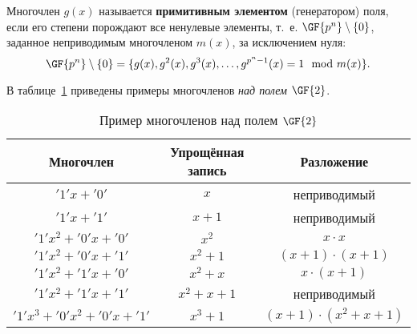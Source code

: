 Многочлен $g(x)$ называется \textbf{примитивным элементом} (генератором) поля, если его степени порождают все ненулевые элементы, т.~е. $\GF{p^n} \setminus \{0\}$, заданное неприводимым многочленом $m(x)$, за исключением нуля:
    \[ \GF{p^n} \setminus \{0\} = \{ g(x), g^2(x), g^3(x), \dots, g^{p^n-1}(x) = 1 \mod m(x) \}. \]

\example
В таблице~\ref{tab:irreducible-gf2} приведены примеры многочленов \emph{над полем} $\GF{2}$.
\begin{table}[!ht]
    \centering
    \caption{Пример многочленов над полем $\GF{2}$\label{tab:irreducible-gf2}}
    \begin{tabular}{|c|c|c|}
        \hline
        Многочлен & \parbox{2.5cm}{Упрощённая запись} & Разложение \\
        \hline
        $'1' x + '0'$ & $x$ & неприводимый \\
        $'1' x + '1'$ & $x+1$ & неприводимый \\
        $'1' x^2 + '0' x + '0'$ & $x^2$ & $x \cdot x$ \\
        $'1' x^2 + '0'x + '1'$ & $x^2 + 1$ & $(x+1) \cdot (x+1)$ \\
        $'1' x^2 + '1' x + '0'$ & $x^2 + x$ & $x \cdot (x+1)$ \\
        $'1' x^2 + '1' x + '1'$ & $x^2 + x + 1$ & неприводимый \\
        $'1' x^3 + '0' x^2 + '0' x + '1'$ & $x^3 + 1$ & $(x+1) \cdot (x^2+x+1)$ \\
        \hline
    \end{tabular}
\end{table}
\exampleend
